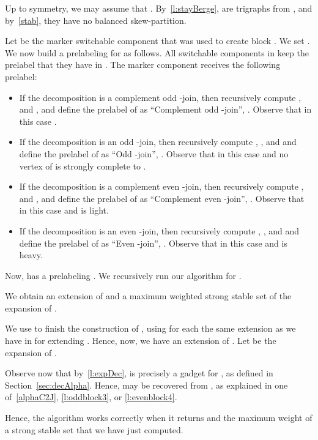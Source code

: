 \documentclass[11 pt] {article}
\begin{document}
Up to symmetry, we may assume that . By~\ref{l:stayBerge},  are trigraphs from ,
and by~\ref{stab}, they have no balanced skew-partition.

Let  be the marker switchable component that was used to create
block .  We set .  We now
build a prelabeling  for  as follows.  All
switchable components in  keep the prelabel that they have
in .  The marker component  receives the following
prelabel:
\begin{itemize}
\item If the decomposition is a complement odd -join, then
  recursively compute
  ,  and
  , and define the prelabel of  as
  ``Complement odd -join'', .
  Observe that in this case .

\item If the decomposition is an odd -join, then recursively compute , ,  and  and define the prelabel of  as ``Odd -join'',
  . Observe that in
  this case  
  and no vertex of  is strongly complete to .


\item If the decomposition is a complement even -join, then
  recursively compute
  ,  and
  , and define the prelabel of  as
  ``Complement even -join'', .  
  Observe that in  this case  and  is light.

\item If the decomposition is an even -join, then recursively compute
  , ,  and
   and define the prelabel of  as
  ``Even -join'', .
 Observe that in  this case  and  is heavy.

\end{itemize}

Now,  has a prelabeling .  We
recursively run our algorithm for .

We obtain an extension  of  and a maximum
weighted strong stable set of the expansion  of .

We use  to finish the construction of , 
using for each  the same extension as we have in
 for extending .  Hence, now, we have an
extension  of .  Let  be the expansion of
.

Observe now that by~\ref{l:expDec},  is precisely a gadget for
, as defined in Section~\ref{sec:decAlpha}.  Hence, 
may be recovered from , as explained in one
of~\ref{alphaC2J}, \ref{l:oddblock3}, or \ref{l:evenblock4}.

Hence, the algorithm works  correctly when it returns  and the 
maximum weight of a strong stable set that we have just computed.

\medskip
\end{document}
